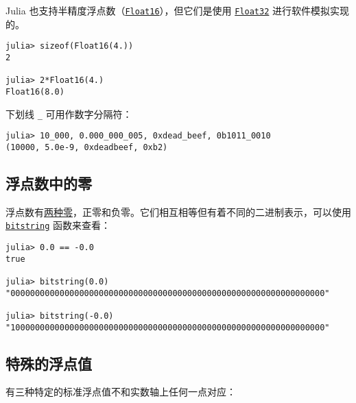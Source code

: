 Julia 也支持半精度浮点数（\hyperlink{2727296760866702904}{\texttt{Float16}}），但它们是使用 \hyperlink{8101639384272933082}{\texttt{Float32}} 进行软件模拟实现的。




\begin{verbatim}
julia> sizeof(Float16(4.))
2

julia> 2*Float16(4.)
Float16(8.0)
\end{verbatim}



下划线 \texttt{\_} 可用作数字分隔符：




\begin{verbatim}
julia> 10_000, 0.000_000_005, 0xdead_beef, 0b1011_0010
(10000, 5.0e-9, 0xdeadbeef, 0xb2)
\end{verbatim}



\hypertarget{3917895508430327726}{}


\subsection{浮点数中的零}



浮点数有\href{https://en.wikipedia.org/wiki/Signed\_zero}{两种零}，正零和负零。它们相互相等但有着不同的二进制表示，可以使用 \hyperlink{9171163989026657457}{\texttt{bitstring}} 函数来查看：




\begin{verbatim}
julia> 0.0 == -0.0
true

julia> bitstring(0.0)
"0000000000000000000000000000000000000000000000000000000000000000"

julia> bitstring(-0.0)
"1000000000000000000000000000000000000000000000000000000000000000"
\end{verbatim}



\hypertarget{16626704755049875766}{}


\subsection{特殊的浮点值}



有三种特定的标准浮点值不和实数轴上任何一点对应：




